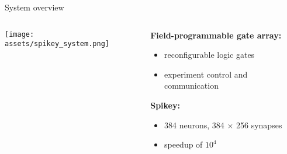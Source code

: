 \documentclass[aspectratio=169]{beamer}
\begin{document}
%

\begin{frame}{System overview}
	\begin{columns}[onlytextwidth]
		\begin{column}{0.40\textwidth}
			\texttt{[image: assets/spikey\_system.png]}
			\vspace{2ex}
			\begin{center}
			\end{center}
		\end{column}
		\hfill
		\begin{column}{0.50\textwidth}

			\textbf{Field-programmable gate array:}
			\begin{itemize}
				\item reconfigurable logic gates
				\item experiment control and communication
			\end{itemize}

			\vspace{3ex}

			\textbf{Spikey:}
			\begin{itemize}
				\item 384 neurons, 384 $\times$ 256 synapses
				\item speedup of $10^4$
			\end{itemize}
		\end{column}
	\end{columns}
\end{frame}
\end{document}

